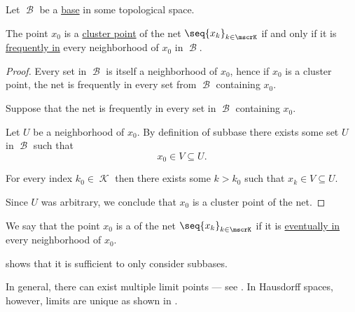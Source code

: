 \begin{proposition}\label{thm:net_cluster_point_base}
  Let \( \mscrB \) be a \hyperref[def:topological_base]{base} in some topological space.

  The point \( x_0 \) is a \hyperref[def:net_cluster_point]{cluster point} of the net \( \seq{ x_k }_{k \in \mscrK} \) if and only if it is \hyperref[def:net_frequently_in]{frequently in} every neighborhood of \( x_0 \) in \( \mscrB \).
\end{proposition}
\begin{proof}
  \SufficiencySubProof Every set in \( \mscrB \) is itself a neighborhood of \( x_0 \), hence if \( x_0 \) is a cluster point, the net is frequently in every set from \( \mscrB \) containing \( x_0 \).

  \NecessitySubProof Suppose that the net is frequently in every set in \( \mscrB \) containing \( x_0 \).

  Let \( U \) be a neighborhood of \( x_0 \). By definition of subbase there exists some set \( U \) in \( \mscrB \) such that
  \begin{equation*}
    x_0 \in V \subseteq U.
  \end{equation*}

  For every index \( k_0 \in \mscrK \) then there exists some \( k > k_0 \) such that \( x_k \in V \subseteq U \).

  Since \( U \) was arbitrary, we conclude that \( x_0 \) is a cluster point of the net.
\end{proof}

\begin{definition}\label{def:net_limit_point}
  We say that the point \( x_0 \) is a  of the net \( \seq{ x_k }_{k \in \mscrK} \) if it is \hyperref[def:net_eventually_in]{eventually in} every neighborhood of \( x_0 \).
\end{definition}
\begin{comments}
  \item {} shows that it is sufficient to only consider subbases.

  \item In general, there can exist multiple limit points --- see . In Hausdorff spaces, however, limits are unique as shown in .
\end{comments}

